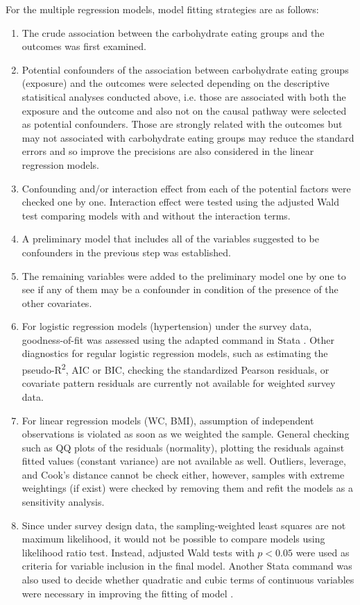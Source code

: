 For the multiple regression models, model fitting strategies are as follows: 

\begin{enumerate}
	\item The crude association between the carbohydrate eating groups and the outcomes was first examined. 
	\item Potential confounders of the association between carbohydrate eating groups (exposure) and the outcomes were selected depending on the descriptive statisitical analyses conducted above, i.e. those are associated with both the exposure and the outcome and also not on the causal pathway were selected as potential confounders. Those are strongly related with the outcomes but may not associated with carbohydrate eating groups may reduce the standard errors and so improve the precisions are also considered in the linear regression models. 
	\item Confounding and/or interaction effect from each of the potential factors were checked one by one. Interaction effect were tested using the adjusted Wald test comparing models with and without the interaction terms.  
	\item A preliminary model that includes all of the variables suggested to be confounders in the previous step was established. 
	\item The remaining variables were added to the preliminary model one by one to see if any of them may be a confounder in condition of the presence of the other covariates. 
	\item For logistic regression models (hypertension) under the survey data, goodness-of-fit was assessed using the adapted  command in Stata \parencite{archer2006goodness}. Other diagnostics for regular logistic regression models, such as estimating the pseudo-R\textsuperscript{2},  AIC or BIC, checking the standardized Pearson residuals, or covariate pattern residuals are currently not available for weighted survey data. 
	\item For linear regression models (WC, BMI), assumption of independent observations is violated as soon as we weighted the sample. General checking such as QQ plots of the residuals (normality), plotting the residuals against fitted values (constant variance) are not available as well. Outliers, leverage, and Cook's distance cannot be check either, however, samples with extreme weightings (if exist) were checked by removing them and refit the models as a sensitivity analysis.
	\item Since under survey design data, the sampling-weighted least squares are not maximum likelihood, it would not be possible to compare models using likelihood ratio test. Instead, adjusted Wald tests with $p < 0.05$ were used as criteria for variable inclusion in the final model. Another Stata command  was also used to  decide whether quadratic and cubic terms of continuous variables were necessary in improving the fitting of model \parencite{pregibon1980goodness}. 
\end{enumerate}


